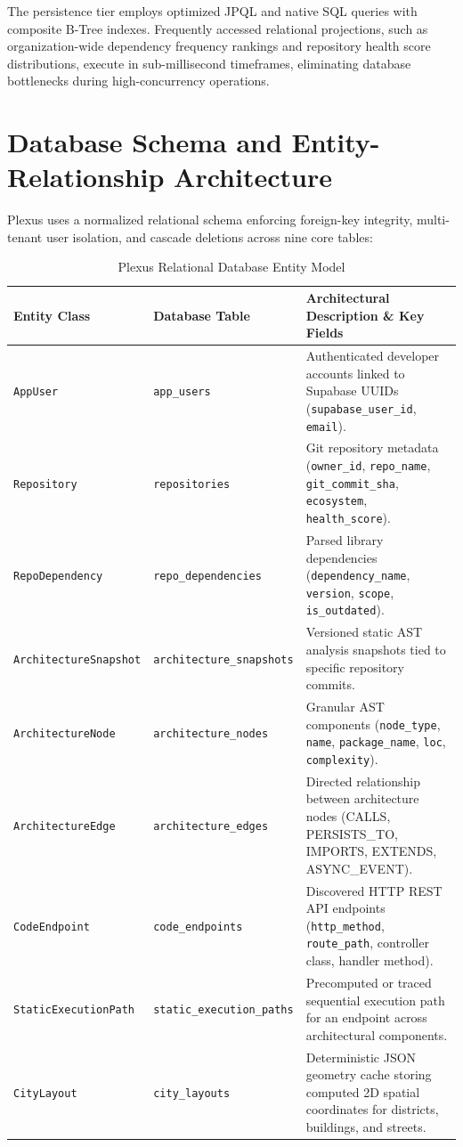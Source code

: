 \documentclass[11pt,a4paper,openany]{report}
\begin{document}
The persistence tier employs optimized JPQL and native SQL queries with composite B-Tree indexes. Frequently accessed relational projections, such as organization-wide dependency frequency rankings and repository health score distributions, execute in sub-millisecond timeframes, eliminating database bottlenecks during high-concurrency operations.

\section{Database Schema and Entity-Relationship Architecture}
Plexus uses a normalized relational schema enforcing foreign-key integrity, multi-tenant user isolation, and cascade deletions across nine core tables:

\begin{table}[htbp]
\centering
\small
\begin{tabularx}{\textwidth}{l l X}
\toprule
\textbf{Entity Class} & \textbf{Database Table} & \textbf{Architectural Description \& Key Fields} \\
\midrule
\texttt{AppUser} & \texttt{app\_users} & Authenticated developer accounts linked to Supabase UUIDs (\texttt{supabase\_user\_id}, \texttt{email}). \\
\texttt{Repository} & \texttt{repositories} & Git repository metadata (\texttt{owner\_id}, \texttt{repo\_name}, \texttt{git\_commit\_sha}, \texttt{ecosystem}, \texttt{health\_score}). \\
\texttt{RepoDependency} & \texttt{repo\_dependencies} & Parsed library dependencies (\texttt{dependency\_name}, \texttt{version}, \texttt{scope}, \texttt{is\_outdated}). \\
\texttt{ArchitectureSnapshot} & \texttt{architecture\_snapshots} & Versioned static AST analysis snapshots tied to specific repository commits. \\
\texttt{ArchitectureNode} & \texttt{architecture\_nodes} & Granular AST components (\texttt{node\_type}, \texttt{name}, \texttt{package\_name}, \texttt{loc}, \texttt{complexity}). \\
\texttt{ArchitectureEdge} & \texttt{architecture\_edges} & Directed relationship between architecture nodes (CALLS, PERSISTS\_TO, IMPORTS, EXTENDS, ASYNC\_EVENT). \\
\texttt{CodeEndpoint} & \texttt{code\_endpoints} & Discovered HTTP REST API endpoints (\texttt{http\_method}, \texttt{route\_path}, controller class, handler method). \\
\texttt{StaticExecutionPath} & \texttt{static\_execution\_paths} & Precomputed or traced sequential execution path for an endpoint across architectural components. \\
\texttt{CityLayout} & \texttt{city\_layouts} & Deterministic JSON geometry cache storing computed 2D spatial coordinates for districts, buildings, and streets. \\
\bottomrule
\end{tabularx}
\caption{Plexus Relational Database Entity Model}
\label{tab:db-entities}
\end{table}
\end{document}
